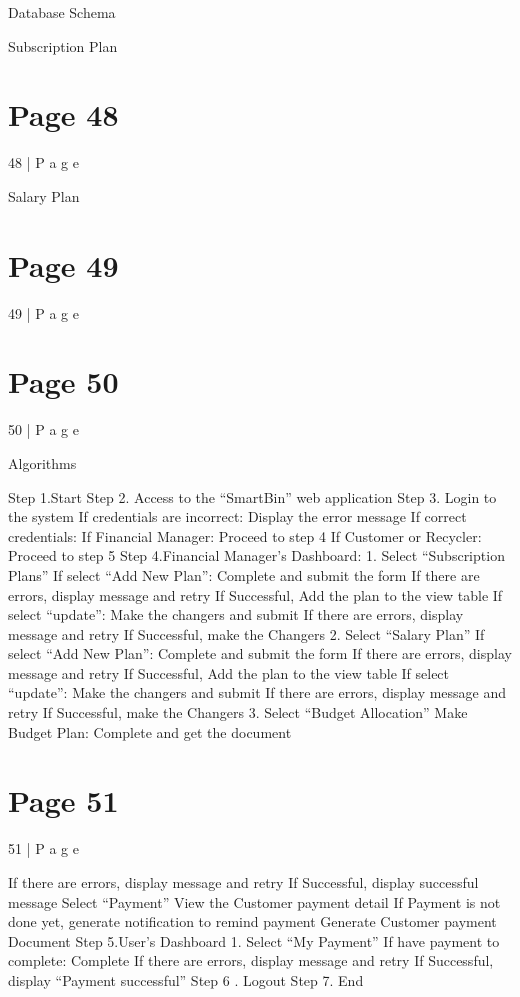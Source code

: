 \documentclass{article}
\begin{document}
 
 
Database Schema 
 
Subscription Plan 

\section*{Page 48}
48 | P a g e 
 
    
 
 
 Salary Plan 
 


\section*{Page 49}
49 | P a g e 
 
 
 
 
 
 


\section*{Page 50}
50 | P a g e 
 
Algorithms 
 
Step 1.Start 
Step 2. Access to the “SmartBin” web application 
Step 3. Login to the system 
  If credentials are incorrect: Display the error message  
 If correct credentials: 
  If Financial Manager: Proceed to step 4 
  If Customer or Recycler: Proceed to step 5 
Step 4.Financial Manager’s Dashboard: 
1. Select “Subscription Plans” 
  If select “Add New Plan”: Complete and submit the form 
   If there are errors, display message and retry 
   If Successful, Add the plan to the view table 
  If select “update”: Make the changers and submit  
   If there are errors, display message and retry 
   If Successful, make the Changers  
2. Select “Salary Plan” 
  If select “Add New Plan”: Complete and submit the form 
   If there are errors, display message and retry 
   If Successful, Add the plan to the view table 
  If select “update”: Make the changers and submit  
   If there are errors, display message and retry 
   If Successful, make the Changers  
3. Select “Budget Allocation” 
  Make Budget Plan: Complete and get the document 

\section*{Page 51}
51 | P a g e 
 
   If there are errors, display message and retry 
   If Successful, display successful message 
 Select “Payment” 
  View the Customer payment detail 
   If Payment is not done yet, generate notification to remind payment 
  Generate Customer payment Document 
Step 5.User’s Dashboard 
1. Select “My Payment” 
  If have payment to complete: Complete  
   If there are errors, display message and retry 
   If Successful, display “Payment successful” 
Step 6 . Logout 
Step 7. End 
 
\end{document}
